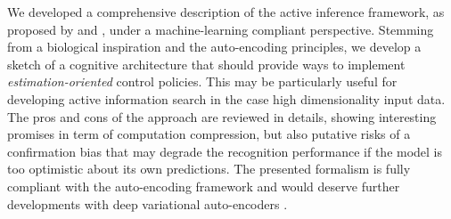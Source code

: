 \documentclass{article} %
\begin{document}
We developed a comprehensive description of the active inference framework, as proposed by \cite{friston2010free} and \cite{friston2012perceptions}, under a machine-learning compliant perspective. Stemming from a biological inspiration and the auto-encoding principles, we develop a sketch of a cognitive architecture that should provide ways to implement \emph{estimation-oriented} control policies.
This may be particularly useful for developing active information search in the case high dimensionality input data.
The pros and cons of the approach are reviewed in details, showing interesting promises in term of computation compression, but also putative risks of a confirmation bias that may degrade the recognition performance if the model is too optimistic about its own predictions. The presented formalism is fully compliant with the auto-encoding framework and would deserve further developments with deep variational auto-encoders \cite{makhzani2015adversarial}.



\end{document}
